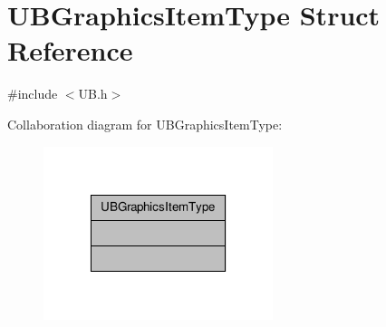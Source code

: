 \hypertarget{struct_u_b_graphics_item_type}{\section{U\-B\-Graphics\-Item\-Type Struct Reference}
\label{dd/dd5/struct_u_b_graphics_item_type}
}


{\ttfamily \#include $<$U\-B.\-h$>$}



Collaboration diagram for U\-B\-Graphics\-Item\-Type\-:
\nopagebreak
\begin{figure}[H]
\begin{center}
\leavevmode
\includegraphics[width=190pt]{d0/d47/struct_u_b_graphics_item_type__coll__graph}
\end{center}
\end{figure}
